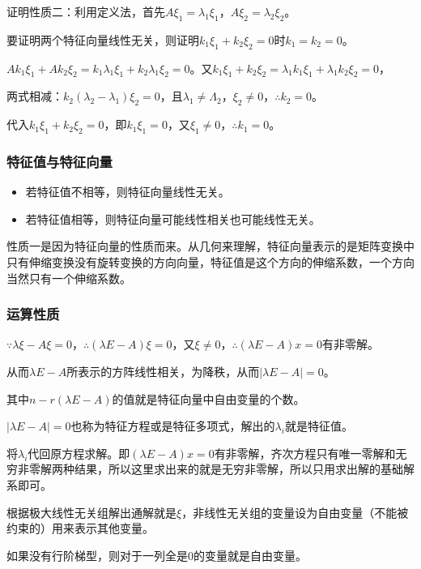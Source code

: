 \documentclass[UTF8, 12pt]{ctexart}
\begin{document}
证明性质二：利用定义法，首先$A\xi_1=\lambda_1\xi_1$，$A\xi_2=\lambda_2\xi_2$。

要证明两个特征向量线性无关，则证明$k_1\xi_1+k_2\xi_2=0$时$k_1=k_2=0$。

$Ak_1\xi_1+Ak_2\xi_2=k_1\lambda_1\xi_1+k_2\lambda_1\xi_2=0$。又$k_1\xi_1+k_2\xi_2=\lambda_1k_1\xi_1+\lambda_1k_2\xi_2=0$，

两式相减：$k_2(\lambda_2-\lambda_1)\xi_2=0$，且$\lambda_1\neq\Lambda_2$，$\xi_2\neq0$，$\therefore k_2=0$。

代入$k_1\xi_1+k_2\xi_2=0$，即$k_1\xi_1=0$，又$\xi_1\neq0$，$\therefore k_1=0$。

\subsubsection{特征值与特征向量}

\begin{itemize}
    \item 若特征值不相等，则特征向量线性无关。
    \item 若特征值相等，则特征向量可能线性相关也可能线性无关。
\end{itemize}

性质一是因为特征向量的性质而来。从几何来理解，特征向量表示的是矩阵变换中只有伸缩变换没有旋转变换的方向向量，特征值是这个方向的伸缩系数，一个方向当然只有一个伸缩系数。

\subsubsection{运算性质}

$\because\lambda\xi-A\xi=0$，$\therefore(\lambda E-A)\xi=0$，又$\xi\neq0$，$\therefore(\lambda E-A)x=0$有非零解。

从而$\lambda E-A$所表示的方阵线性相关，为降秩，从而$\vert\lambda E-A\vert=0$。

其中$n-r(\lambda E-A)$的值就是特征向量中自由变量的个数。

$\vert\lambda E-A\vert=0$也称为特征方程或是特征多项式，解出的$\lambda_i$就是特征值。

将$\lambda_i$代回原方程求解。即$(\lambda E-A)x=0$有非零解，齐次方程只有唯一零解和无穷非零解两种结果，所以这里求出来的就是无穷非零解，所以只用求出解的基础解系即可。

根据极大线性无关组解出通解就是$\xi$，非线性无关组的变量设为自由变量（不能被约束的）用来表示其他变量。

如果没有行阶梯型，则对于一列全是0的变量就是自由变量。
\end{document}
